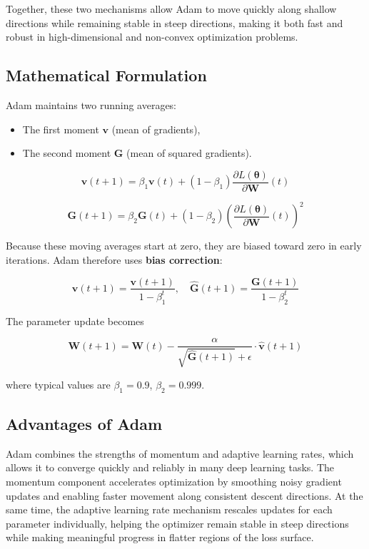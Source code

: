 \documentclass{article}
\begin{document}
Together, these two mechanisms allow Adam to move quickly along shallow directions while remaining stable in steep directions, making it both fast and robust in high-dimensional and non-convex optimization problems.

\subsection{Mathematical Formulation}

Adam maintains two running averages:
\begin{itemize}
    \item The first moment \( \mathbf{v} \) (mean of gradients),
    \item The second moment \( \mathbf{G} \) (mean of squared gradients).
\end{itemize}

\[
\mathbf{v}(t+1) = \beta_1 \mathbf{v}(t) + (1 - \beta_1)
\frac{\partial L(\boldsymbol{\theta})}{\partial \mathbf{W}}(t)
\]

\[
\mathbf{G}(t+1) = \beta_2 \mathbf{G}(t) + (1 - \beta_2)
\left(\frac{\partial L(\boldsymbol{\theta})}{\partial \mathbf{W}}(t)\right)^2
\]

Because these moving averages start at zero, they are biased toward zero in early iterations. Adam therefore uses \textbf{bias correction}:

\[
\hat{\mathbf{v}}(t+1) = \frac{\mathbf{v}(t+1)}{1 - \beta_1^t}, 
\quad
\hat{\mathbf{G}}(t+1) = \frac{\mathbf{G}(t+1)}{1 - \beta_2^t}
\]

The parameter update becomes

\[
\mathbf{W}(t+1) = \mathbf{W}(t) -
\frac{\alpha}{\sqrt{\hat{\mathbf{G}}(t+1)} + \epsilon}
\cdot \hat{\mathbf{v}}(t+1)
\]

\noindent where typical values are \( \beta_1 = 0.9 \), \( \beta_2 = 0.999 \).

\subsection{Advantages of Adam}

Adam combines the strengths of momentum and adaptive learning rates, which allows it to converge quickly and reliably in many deep learning tasks. The momentum component accelerates optimization by smoothing noisy gradient updates and enabling faster movement along consistent descent directions. At the same time, the adaptive learning rate mechanism rescales updates for each parameter individually, helping the optimizer remain stable in steep directions while making meaningful progress in flatter regions of the loss surface.
\end{document}
